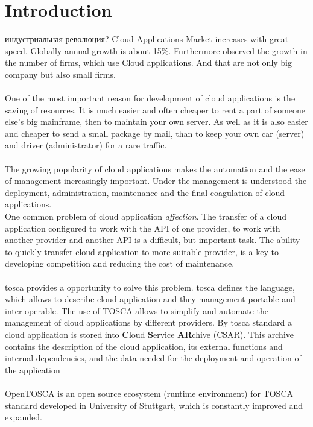 
\chapter{Introduction}
индустриальная революция?
\fi
Cloud Applications Market increases with great speed. Globally annual growth is about 15\%. \cite*{statista_global}
Furthermore observed the growth in the number of firms, which use Cloud applications. And that are not only big company but also small firms. \cite*{destatis_2014, destatis_2016} \\ \\
One of the most important reason for development of cloud applications is the saving of resources.
It is much easier and often cheaper to rent a part of someone else's big mainframe, then to maintain your own server.
As well as it is also easier and cheaper to send a small package by mail, than to keep your own car (server) and driver (administrator) for a rare traffic.\\ \\
The growing popularity of cloud applications makes the automation and the ease of management increasingly important.
Under the management is understood the deployment, administration, maintenance and the final coagulation of cloud applications.\\
One common problem of cloud application \emph{affection}. The transfer of a cloud application configured to work with the API of one provider, to work with another provider and another API is a difficult, but important task. The ability to quickly transfer cloud application to more suitable provider, is a key to developing competition and reducing the cost of maintenance.\\ \\
\gls{tosca} \cite*{TOSCA-v1.0} provides a opportunity to solve this problem. \gls{tosca} defines the language, which allows to describe cloud application and they management portable and inter-operable. 
The use of TOSCA allows to simplify and automate the management of cloud applications by different providers. By \gls{tosca} standard a cloud application is stored into \textbf{C}loud \textbf{S}ervice \textbf{AR}chive (CSAR).
This archive contains the description of the cloud application, its external functions and internal dependencies, and the data needed for the deployment and operation of the application\\\\
OpenTOSCA \cite*{OpenTOSCA} is an open source ecosystem (runtime environment) for TOSCA standard developed in University of Stuttgart, which is constantly improved and expanded.
